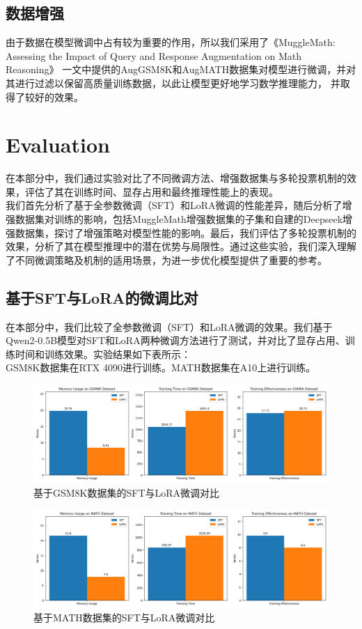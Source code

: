 \documentclass{article}
\begin{document}
\subsection{数据增强}
由于数据在模型微调中占有较为重要的作用，所以我们采用了《MuggleMath: Assessing the Impact of Query and Response Augmentation on Math Reasoning》
一文中提供的AugGSM8K和AugMATH数据集对模型进行微调，并对其进行过滤以保留高质量训练数据，以此让模型更好地学习数学推理能力，
并取得了较好的效果。




\section{Evaluation}

在本部分中，我们通过实验对比了不同微调方法、增强数据集与多轮投票机制的效果，评估了其在训练时间、显存占用和最终推理性能上的表现。\\
我们首先分析了基于全参数微调（SFT）和LoRA微调的性能差异，随后分析了增强数据集对训练的影响，包括MuggleMath增强数据集的子集和自建的Deepseek增强数据集，探讨了增强策略对模型性能的影响。最后，我们评估了多轮投票机制的效果，分析了其在模型推理中的潜在优势与局限性。通过这些实验，我们深入理解了不同微调策略及机制的适用场景，为进一步优化模型提供了重要的参考。

\subsection{基于SFT与LoRA的微调比对}
在本部分中，我们比较了全参数微调（SFT）和LoRA微调的效果。我们基于Qwen2-0.5B模型对SFT和LoRA两种微调方法进行了测试，并对比了显存占用、训练时间和训练效果。实验结果如下表所示：
\\ GSM8K数据集在RTX 4090进行训练。MATH数据集在A10上进行训练。

\begin{figure}[H]
  \centering
  \includegraphics[width=1\textwidth]{GSM8K-LORA.png} %
  \caption{基于GSM8K数据集的SFT与LoRA微调对比} %
  \label{fig:my_label0} %
\end{figure}
\begin{figure}[H]
  \centering
  \includegraphics[width=1\textwidth]{MATH-LORA.png} %
  \caption{基于MATH数据集的SFT与LoRA微调对比} %
  \label{fig:my_label3} %
\end{figure}
\end{document}
